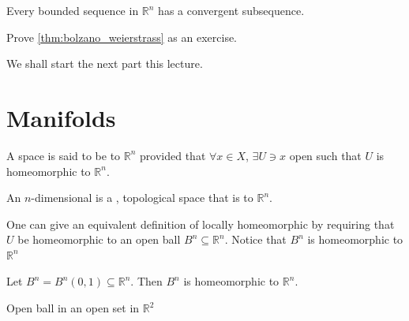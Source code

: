 \documentclass[notoc,notitlepage]{tufte-book}
\begin{document}
\begin{thm}\label{thm:bolzano_weierstrass}
  Every bounded sequence in $\mathbb{R}^n$ has a convergent subsequence.
\end{thm}

\begin{ex}
  Prove \cref{thm:bolzano_weierstrass} as an exercise.
\end{ex}


We shall start the next part this lecture.

\section{Manifolds}%
\label{sec:manifolds}

\begin{defn}\label{defn:locally_homeomorphic}
  A space is said to be  to $\mathbb{R}^n$ provided that
  $\forall x \in X$, $\exists U \ni x$ open such that $U$ is homeomorphic to $\mathbb{R}^n$.
\end{defn}

\begin{defn}[Manifold]\label{defn:manifold}
  An $n$-dimensional  is a ,  topological space that is  to $\mathbb{R}^n$.
\end{defn}

\begin{note}
  One can give an equivalent definition of locally homeomorphic by requiring that
  $U$ be homeomorphic to an open ball $B^n \subseteq \mathbb{R}^n$. Notice that
  $B^n$ is homeomorphic to $\mathbb{R}^n$ 
\end{note}

\begin{eg}
  Let $B^n = B^n(0, 1) \subseteq \mathbb{R}^n$. Then $B^n$ is homeomorphic to 
  $\mathbb{R}^n$.
  \begin{marginfigure}
    \centering
    \caption{Open ball in an open set in $\mathbb{R}^2$}\label{fig:open_ball_in_an_open_set_in_r_2_}
  \end{marginfigure}
\end{eg}
\end{document}
